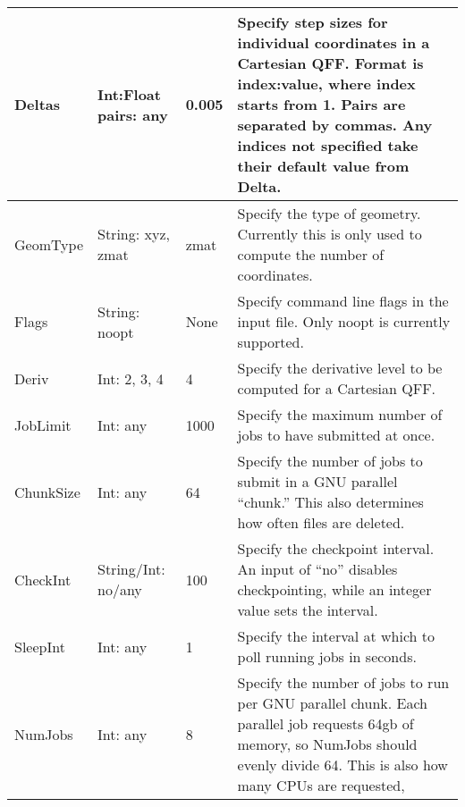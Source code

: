 \documentclass{article}
\begin{document}
\begin{table}[ht]
\begin{tabular}{|l|>{\raggedright}p{}|l|p{}|}
    \hline
    Deltas                        & Int:Float pairs: any & 0.005 & Specify step sizes for individual coordinates
                                                                   in a Cartesian QFF.
                                                                   Format is index:value, where index starts from 1.
                                                                   Pairs are separated by commas. Any indices not
                                                                   specified take their default value from Delta.\\
    \hline
    GeomType                      & String: xyz, zmat & zmat & Specify the type of geometry.
                                                               Currently this is only used to
                                                               compute the number of coordinates.\\
    \hline
    Flags                         & String: noopt & None & Specify command line flags in the input file.
                                                           Only noopt is currently supported.\\
    \hline
    Deriv                         & Int: 2, 3, 4 & 4 & Specify the derivative level to be computed for a Cartesian QFF.\\
    \hline
    JobLimit                      & Int: any & 1000 & Specify the maximum number of jobs to have submitted at once.\\
    \hline
    ChunkSize                     & Int: any & 64 & Specify the number of jobs to submit in a GNU parallel ``chunk.''
                                                    This also determines how often files are deleted.\\
    \hline
    CheckInt                      & String/Int: no/any & 100 & Specify the checkpoint interval. An input of ``no''
                                                               disables checkpointing, while an integer value sets
                                                               the interval.\\
    \hline
    SleepInt                      & Int: any & 1 & Specify the interval at which to poll running jobs in seconds.\\
    \hline
    NumJobs                       & Int: any & 8 & Specify the number of jobs to run per GNU parallel chunk.
                                                   Each parallel job requests 64gb of memory, so NumJobs
                                                   should evenly divide 64. This is also how many CPUs are requested,

\end{tabular}
\end{table}
\end{document}
